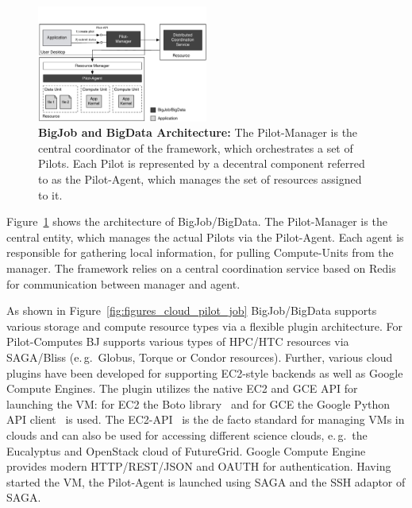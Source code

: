 \documentclass[times]{cpeauth}
\newcommand{\pilot}{Pilot\xspace}
\newcommand{\pilots}{Pilots\xspace}
\newcommand{\pilotcomputes}{Pilot-Computes\xspace}
\newcommand{\computeunits}{Compute-Units\xspace}
\newcommand{\upp}{\vspace*{-0.5em}}
\begin{document}
\begin{figure}
	\upp	\upp	\upp
	\centering
	\includegraphics[width=0.5\textwidth]{figures/bigjob-bigdata-architecture.pdf}
	\caption{\textbf{BigJob and BigData Architecture:} The \pilot-Manager is 
	the central coordinator of the framework, which orchestrates a set of 
	Pilots. Each Pilot is represented by a decentral component referred to as 
	the Pilot-Agent, which manages the set of resources assigned to it. }
	\label{fig:figures_bigjob-bigdata-architecture}
\end{figure}

Figure~\ref{fig:figures_bigjob-bigdata-architecture} shows the architecture of
BigJob/BigData. The \pilot-Manager is the central entity, which manages the
actual \pilots via the \pilot-Agent. Each agent is responsible for gathering
local information, for pulling \computeunits from the manager. The framework
relies on a central coordination service based on Redis~\cite{redis} for
communication between manager and agent.

As shown in Figure~\ref{fig:figures_cloud_pilot_job} BigJob/BigData supports
various storage and compute resource types via a flexible plugin architecture.
For \pilotcomputes BJ supports various types of HPC/HTC resources via
SAGA/Bliss (e.\,g.\ Globus, Torque or Condor resources). Further, various
cloud plugins have been developed for supporting EC2-style backends as well as
Google Compute Engines. The plugin utilizes the native EC2 and GCE API for
launching the VM: for EC2 the Boto library~\cite{boto} and for GCE 
the Google Python API client~\cite{google-api-client} is used.
The EC2-API~\cite{amazonec2api} is the de facto standard for
managing VMs in clouds and can also be used for accessing different science
clouds, e.\,g.\ the Eucalyptus and OpenStack cloud of FutureGrid. Google
Compute Engine provides modern HTTP/REST/JSON and OAUTH for authentication.
Having started the VM, the \pilot-Agent is launched using SAGA and the SSH
adaptor of SAGA.
\end{document}
